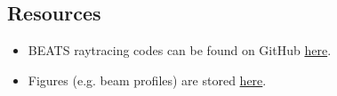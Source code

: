 \subsection{Resources}
\begin{itemize}
    \item BEATS raytracing codes can be found on GitHub \href{https://github.com/gianthk/BEATS_raytracing}{here}.
    \item Figures (e.g. beam profiles) are stored \href{https://github.com/gianthk/BEATS_raytracing/tree/master/DMM/figures/slope_error}{here}.
\end{itemize}